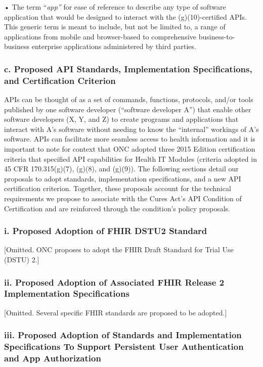 \documentclass[twoside,11pt]{article}
\begin{document}
          • The term “\emph{app”} for ease of reference to describe any type of software application that would be designed to interact with the (g)(10)-certified APIs. This generic term is meant to include, but not be limited to, a range of applications from mobile and browser-based to comprehensive business-to-business enterprise applications administered by third parties.


          \subsubsection{c. Proposed API Standards, Implementation Specifications, and Certification Criterion}

          APIs can be thought of as a set of commands, functions, protocols, and/or tools published by one software developer (“software developer A”) that enable other software developers (X, Y, and Z) to create programs and applications that interact with A's software without needing to know the “internal” workings of A's software. APIs can facilitate more seamless access to health information and it is important to note for context that ONC adopted three 2015 Edition certification criteria that specified API capabilities for Health IT Modules (criteria adopted in 45 CFR 170.315(g)(7), (g)(8), and (g)(9)). The following sections detail our proposals to adopt standards, implementation specifications, and a new API certification criterion. Together, these proposals account for the technical requirements we propose to associate with the Cures Act's API Condition of Certification and are reinforced through the condition's policy proposals.


          \subsubsection{i. Proposed Adoption of FHIR DSTU2 Standard}

[Omitted. ONC proposes to adopt the FHIR Draft Standard for Trial Use (DSTU) 2.]

          \subsubsection{ii. Proposed Adoption of Associated FHIR Release 2 Implementation Specifications}

[Omitted. Several specific FHIR standards are proposed to be adopted.]

          \subsubsection{iii. Proposed Adoption of Standards and Implementation Specifications To Support Persistent User Authentication and App Authorization}
\end{document}
